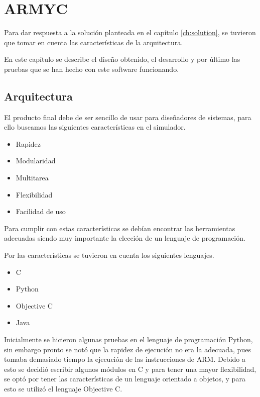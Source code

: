 \chapter{ARMYC}\label{ch:simulador_arm}

Para dar respuesta a la solución planteada en el capítulo \ref{ch:solution}, se tuvieron que tomar en cuenta las características de la arquitectura.

En este capítulo se describe el diseño obtenido, el desarrollo y por último las pruebas que se han hecho con este software funcionando.

\section{Arquitectura}

El producto final debe de ser sencillo de usar para diseñadores de sistemas, para ello buscamos las siguientes características en el simulador.

\begin{itemize}
\item Rapidez
\item Modularidad
\item Multitarea
\item Flexibilidad
\item Facilidad de uso
\end{itemize}

Para cumplir con estas características se debían encontrar las herramientas adecuadas siendo muy importante la elección de un lenguaje de programación.

Por las características se tuvieron en cuenta los siguientes lenguajes.

\begin{itemize}
\item C
\item Python
\item Objective C
\item Java
\end{itemize}

Inicialmente se hicieron algunas pruebas en el lenguaje de programación Python, sin embargo pronto se notó que la rapidez de ejecución no era la adecuada, pues tomaba demasiado tiempo la ejecución de las instrucciones de ARM. Debido a esto se decidió escribir algunos módulos en C y para tener una mayor flexibilidad, se optó por tener las características de un lenguaje orientado a objetos, y para esto se utilizó el lenguaje Objective C.

